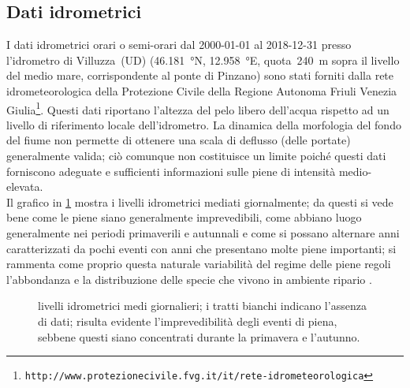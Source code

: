 \subsection{Dati idrometrici}
I dati idrometrici orari o semi-orari dal 2000-01-01 al 2018-12-31 presso l'idrometro di Villuzza~(UD) (\SI{46.181}{\degree}N, \SI{12.958}{\degree}E, quota~\SI{240}{\m} sopra il livello del medio mare, corrispondente al ponte di Pinzano) sono stati forniti dalla
rete idrometeorologica della Protezione Civile della Regione Autonoma Friuli Venezia Giulia\footnote{\texttt{http://www.protezionecivile.fvg.it/it/rete-idrometeorologica}}.
Questi dati riportano l'altezza del pelo libero dell'acqua rispetto ad un livello di riferimento locale dell'idrometro.
La dinamica della morfologia del fondo del fiume non permette di ottenere una scala di deflusso (delle portate) generalmente valida; ciò comunque non costituisce un limite poiché questi dati forniscono adeguate e sufficienti informazioni sulle piene di intensità medio-elevata.
\\
Il grafico in \cref{graph:livelli-matrix} mostra i livelli idrometrici mediati giornalmente; da questi si vede bene come le piene siano generalmente imprevedibili, come abbiano luogo generalmente nei periodi primaverili e autunnali e come si possano alternare anni caratterizzati da pochi eventi con anni che presentano molte piene importanti; si rammenta come proprio questa naturale variabilità del regime delle piene regoli l'abbondanza e la distribuzione delle specie che vivono in ambiente ripario .
%
\begin{figure}
	\centering
	
	\caption[livelli idrometrici medi giornalieri]{livelli idrometrici medi giornalieri; i tratti bianchi indicano l'assenza di dati; risulta evidente l'imprevedibilità degli eventi di piena, sebbene questi siano concentrati durante la primavera e l'autunno.}
	\label{graph:livelli-matrix}
\end{figure}

